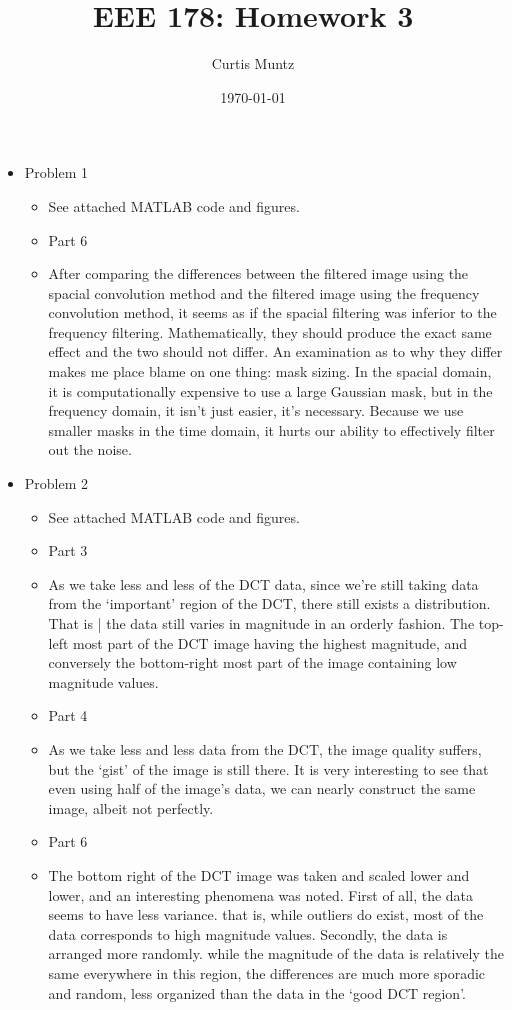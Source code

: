 \documentclass{article}
\title{EEE 178: Homework 3}
\date{\today}
\author{Curtis Muntz}
\begin{document}
\maketitle
\begin{itemize}
	\item Problem 1
	\begin{itemize}
    \item See attached MATLAB code and figures.
		\item Part 6
		\item[] After comparing the differences between the filtered image using the spacial convolution method and the filtered image using the frequency convolution method, it seems as if the spacial filtering was inferior to the frequency filtering. Mathematically, they should produce the exact same effect and the two should not differ. An examination as to why they differ makes me place blame on one thing: mask sizing. In the spacial domain, it is computationally expensive to use a large Gaussian mask, but in the frequency domain, it isn't just easier, it's necessary. Because we use smaller masks in the time domain, it hurts our ability to effectively filter out the noise.
	\end{itemize}
  \item Problem 2
    \begin{itemize}
      \item See attached MATLAB code and figures.
      \item Part 3
      \item[] As we take less and less of the DCT data, since we're still taking data from the `important' region of the DCT, there still exists a distribution. That is | the data still varies in magnitude in an orderly fashion. The top-left most part of the DCT image having the highest magnitude, and conversely the bottom-right most part of the image containing low magnitude values.
      \item Part 4
      \item[] As we take less and less data from the DCT, the image quality suffers, but the `gist' of the image is still there. It is very interesting to see that even using half of the image's data, we can nearly construct the same image, albeit not perfectly.
      \item Part 6
      \item[] The bottom right of the DCT image was taken and scaled lower and lower, and an interesting phenomena was noted. First of all, the data seems to have less variance. that is, while outliers do exist, most of the data corresponds to high magnitude values. Secondly, the data is arranged more randomly. while the magnitude of the data is relatively the same everywhere in this region, the differences are much more sporadic and random, less organized than the data in the `good DCT region'.

\end{itemize}
\end{itemize}
\end{document}
